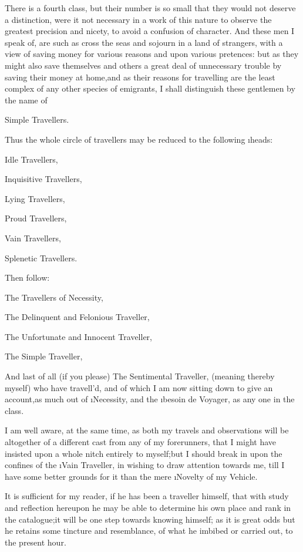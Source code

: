 \documentclass[twoside]{article}
\begin{document}
There is a fourth class, but their number is so small that they would not
deserve a distinction, were it not necessary in a work of this nature to
observe the greatest precision and nicety, to avoid a confusion of
character.  And these men I speak of, are such as cross the seas and
sojourn in a land of strangers, with a view of saving money for various
reasons and upon various pretences: but as they might also save
themselves and others a great deal of unnecessary trouble by saving their
money at home,\tsk and as their reasons for travelling are the least complex
of any other species of emigrants, I shall distinguish these gentlemen by
the name of

                            Simple Travellers.

Thus the whole circle of travellers may be reduced to the following
\i{heads}:\tsk 

  Idle Travellers,

  Inquisitive Travellers,

  Lying Travellers,

  Proud Travellers,

  Vain Travellers,

  Splenetic Travellers.

Then follow:

  The Travellers of Necessity,

  The Delinquent and Felonious Traveller,

  The Unfortunate and Innocent Traveller,

  The Simple Traveller,

And last of all (if you please) The Sentimental Traveller, (meaning
thereby myself) who have travell’d, and of which I am now sitting down to
give an account,\tsk as much out of \i{Necessity}, and the \i{besoin de Voyager},
as any one in the class.

I am well aware, at the same time, as both my travels and observations
will be altogether of a different cast from any of my forerunners, that I
might have insisted upon a whole nitch entirely to myself;\tsk but I should
break in upon the confines of the \i{Vain} Traveller, in wishing to draw
attention towards me, till I have some better grounds for it than the
mere \i{Novelty of my Vehicle}.

It is sufficient for my reader, if he has been a traveller himself, that
with study and reflection hereupon he may be able to determine his own
place and rank in the catalogue;\tsk it will be one step towards knowing
himself; as it is great odds but he retains some tincture and
resemblance, of what he imbibed or carried out, to the present hour.
\end{document}

